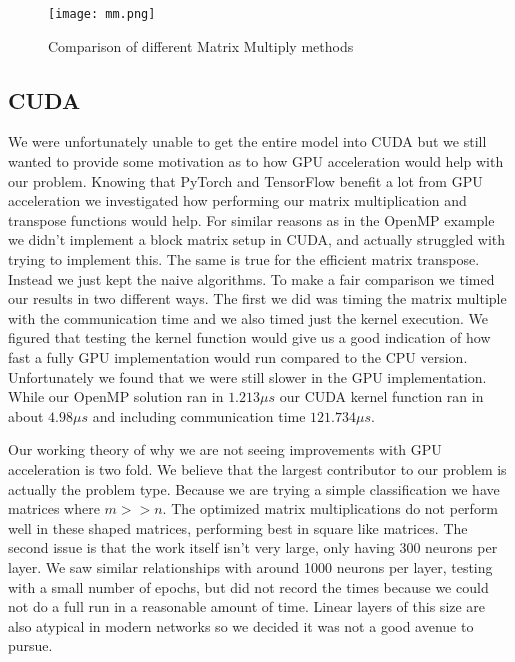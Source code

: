 \begin{figure}[ht]
\centering
\texttt{[image: mm.png]}
\caption{Comparison of different Matrix Multiply methods}
    \label{fig:mm}
\end{figure}

\subsection{CUDA}\label{sec:r-cuda}
We were unfortunately unable to get the entire model into CUDA but we still
wanted to provide some motivation as to how GPU acceleration would help with our
problem. Knowing that PyTorch and TensorFlow benefit a lot from GPU acceleration
we investigated how performing our matrix multiplication and transpose functions
would help. For similar reasons as in the OpenMP example we didn't implement a
block matrix setup in CUDA, and actually struggled with trying to implement
this. The same is true for the efficient matrix transpose. Instead we just kept
the naive algorithms. To make a fair comparison we timed our results in two
different ways. The first we did was timing the matrix multiple with the
communication time and we also timed just the kernel execution. We figured that
testing the kernel function would give us a good indication of how fast a fully
GPU implementation would run compared to the CPU version. Unfortunately we found
that we were still slower in the GPU implementation. While our OpenMP solution ran
in $1.213\mu s$ our CUDA kernel function ran in about $4.98\mu s$ and including
communication time $121.734\mu s$.

Our working theory of why we are not seeing improvements with GPU acceleration
is two fold. We believe that the largest contributor to our problem is actually
the problem type. Because we are trying a simple classification we have matrices
where $m>>n$. The optimized matrix multiplications do not perform well in these
shaped matrices, performing best in square like matrices. The second issue is
that the work itself isn't very large, only having 300 neurons per layer. We saw
similar relationships with around 1000 neurons per layer, testing with a small
number of epochs, but did not record the times because we could not do a full
run in a reasonable amount of time. Linear layers of this size are also atypical
in modern networks so we decided it was not a good avenue to pursue. 

